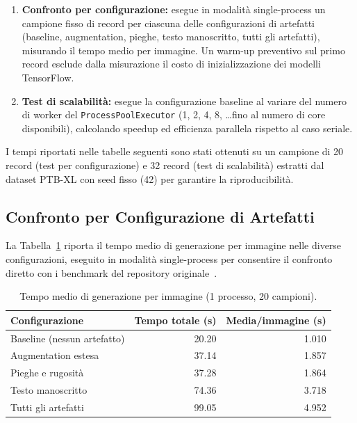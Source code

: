 \begin{enumerate}
    \item \textbf{Confronto per configurazione:} esegue in modalità single-process un campione fisso di record per ciascuna delle configurazioni di artefatti (baseline, augmentation, pieghe, testo manoscritto, tutti gli artefatti), misurando il tempo medio per immagine. Un warm-up preventivo sul primo record esclude dalla misurazione il costo di inizializzazione dei modelli TensorFlow.
    \item \textbf{Test di scalabilità:} esegue la configurazione baseline al variare del numero di worker del \texttt{ProcessPoolExecutor} (1, 2, 4, 8, \ldots fino al numero di core disponibili), calcolando speedup ed efficienza parallela rispetto al caso seriale.
\end{enumerate}

I tempi riportati nelle tabelle seguenti sono stati ottenuti su un campione di 20 record (test per configurazione) e 32 record (test di scalabilità) estratti dal dataset PTB-XL con seed fisso (42) per garantire la riproducibilità.

\subsection{Confronto per Configurazione di Artefatti}

La Tabella~\ref{tab:bench_config} riporta il tempo medio di generazione per immagine nelle diverse configurazioni, eseguito in modalità single-process per consentire il confronto diretto con i benchmark del repository originale~\cite{ecgimagekitpaper}.

\begin{table}[H]
\centering
\caption{Tempo medio di generazione per immagine (1 processo, 20 campioni).}
\label{tab:bench_config}
\begin{tabular}{lrr}
\hline
\textbf{Configurazione} & \textbf{Tempo totale (s)} & \textbf{Media/immagine (s)} \\
\hline
Baseline (nessun artefatto)   & 20.20 & 1.010 \\
Augmentation estesa           & 37.14 & 1.857 \\
Pieghe e rugosità             & 37.28 & 1.864 \\
Testo manoscritto             & 74.36 & 3.718 \\
Tutti gli artefatti           & 99.05 & 4.952 \\
\hline
\end{tabular}
\end{table}

